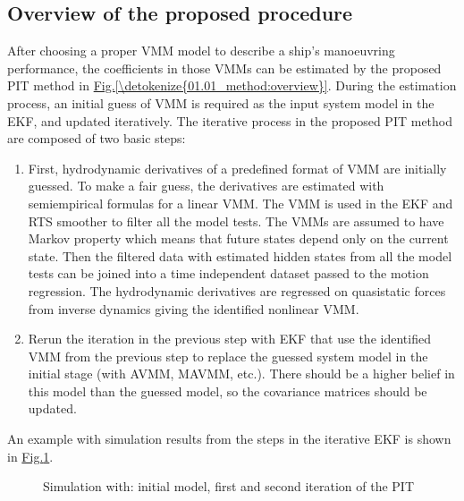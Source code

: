 \documentclass[review]{elsarticle}
\begin{document}
\subsection{Overview of the proposed procedure}
\label{\detokenize{01.01_method:overview-of-the-proposed-procedure}}
\sphinxAtStartPar
After choosing a proper VMM model to describe a ship’s manoeuvring performance, the coefficients in those VMMs can be estimated by the proposed PIT method in \hyperref[\detokenize{01.01_method:overview}]{Fig.\@ \ref{\detokenize{01.01_method:overview}}}. During the estimation process, an initial guess of VMM is required as the input system model in the EKF, and updated iteratively. The iterative process in the proposed PIT method are composed of two basic steps:
\begin{enumerate}
%
\item {} 
\sphinxAtStartPar
First, hydrodynamic derivatives of a pre\sphinxhyphen{}defined format of VMM are initially guessed. To make a fair guess, the derivatives are estimated with semi\sphinxhyphen{}empirical formulas for a linear VMM. The VMM is used in the EKF and RTS smoother to filter all the model tests. The VMMs are assumed to have Markov property which means that future states depend only on the current state. Then the filtered data with estimated hidden states from all the model tests can be joined into a time independent dataset passed to the motion regression. The hydrodynamic derivatives are regressed on quasi\sphinxhyphen{}static forces from inverse dynamics giving the identified nonlinear VMM.

\item {} 
\sphinxAtStartPar
Re\sphinxhyphen{}run the iteration in the previous step with EKF that use the identified VMM from the previous step to replace the guessed system model in the initial stage (with AVMM, MAVMM, etc.). There should be a higher belief in this model than the guessed model, so the covariance matrices should be updated.

\end{enumerate}

\sphinxAtStartPar
An example with simulation results from the steps in the iterative EKF is shown in \hyperref[\detokenize{01.01_method:iterations}]{Fig.\@ \ref{\detokenize{01.01_method:iterations}}}.

\begin{figure}[H]
\centering
\capstart

\noindent{}
\caption{Simulation with: initial model, first and second iteration of the PIT}\label{\detokenize{01.01_method:iterations}}\end{figure}
\end{document}
